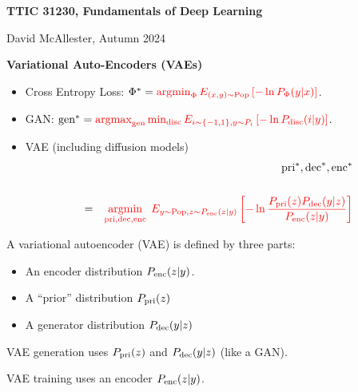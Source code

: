 




{\Huge

  \centerline{\bf TTIC 31230, Fundamentals of Deep Learning}

\bigskip

\centerline{David McAllester, Autumn  2024}

\vfill \vfill

\centerline{\bf Variational Auto-Encoders (VAEs)}

\vfill \vfill


\begin{itemize}
\item Cross Entropy Loss: $\Phi^* = {\color{red} \operatorname*{argmin}_\Phi E_{(x,y)\sim \mathrm{Pop}}\left[-\ln P_\Phi(y|x)\right]}$.

\vfill
\item GAN: $\mathrm{gen}^* = {\color{red} \operatorname*{argmax}_{\mathrm{gen}} \min_{\mathrm{disc}} E_{i \sim \{-1,1\}, y \sim P_i}\left[-\ln P_{\mathrm{disc}}(i|y)\right]}$.

\vfill
\item VAE (including diffusion models)
\begin{eqnarray*}
& & \mathrm{pri}^*,\mathrm{dec}^*,\mathrm{enc}^* \\
\\
& = & {\color{red} \operatorname*{argmin}_{\mathrm{pri},\mathrm{dec},\mathrm{enc}}\;E_{y \sim \mathrm{Pop},z \sim P_{\mathrm{enc}}(z|y)}\left[ - \ln \frac{P_{\mathrm{pri}}(z)P_{\mathrm{dec}}(y|z)}{P_{\mathrm{enc}}(z|y)}\right]}
\end{eqnarray*}
\end{itemize}

A variational autoencoder (VAE) is defined by three parts:

\vfill
\begin{itemize}
\item An encoder distribution $P_{\mathrm{enc}}(z|y)$.

\vfill
\item A ``prior'' distribution $P_{\mathrm{pri}}(z)$

\vfill
\item A generator distribution $P_{\mathrm{dec}}(y|z)$
\end{itemize}

\vfill
VAE generation uses $P_{\mathrm{pri}}(z)$ and $P_{\mathrm{dec}}(y|z)$ (like a GAN).

\vfill
VAE training uses an encoder $P_{\mathrm{enc}}(z|y)$.

}
